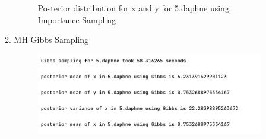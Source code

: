\documentclass{article}
\begin{document}
\begin{enumerate}
\begin{enumerate}
\begin{figure}[!htp] 
    \centering
    \hfill%
        \caption{Posterior distribution for x and y for 5.daphne using Importance Sampling}
\end{figure}

\newpage
\item MH Gibbs Sampling

\begin{figure}[!ht]
	\centering
	\includegraphics[scale=0.5]{../figs/Gibbs/5_program_results}
\end{figure}


\end{enumerate}
\end{enumerate}
\end{document}
